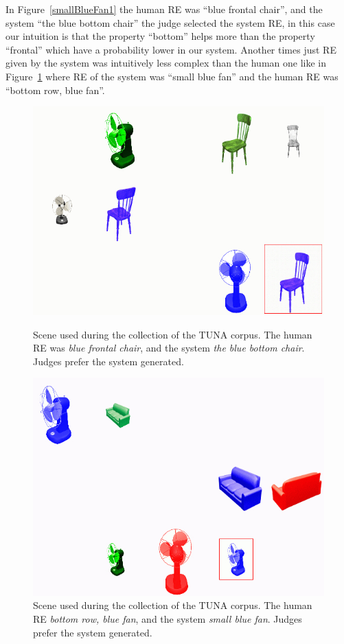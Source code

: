 In Figure~\ref{smallBlueFan1} the human RE was ``blue frontal chair'', and the system ``the blue bottom chair'' the judge selected the system RE, in this case our intuition is that the property ``bottom'' helps more than the property ``frontal'' which have a probability lower in our system. Another times just RE given by the system was intuitively less complex than the human one like in Figure~\ref{smallBlueFan} where RE of the system was ``small blue fan'' and the human RE was ``bottom row, blue fan''.
\begin{figure}[ht]
\begin{minipage}{0.50\linewidth}
\centering
\includegraphics[width=\textwidth]{images/tuna.jpg} %
\caption{Scene used during the collection of the TUNA corpus. The human RE was \emph{blue frontal chair}, and the system \emph{the blue bottom chair}. Judges prefer the system generated.}
\label{smallBlueFan1}
\end{minipage}
\begin{minipage}{0.50\linewidth}
\centering
\includegraphics[width=\textwidth]{images/smallBlueFan.jpg}
\caption{Scene used during the collection of the TUNA corpus. The human RE \emph{bottom row, blue fan}, and the system \emph{small blue fan}. Judges prefer the system generated.}
\label{smallBlueFan}
\end{minipage}
\end{figure}

